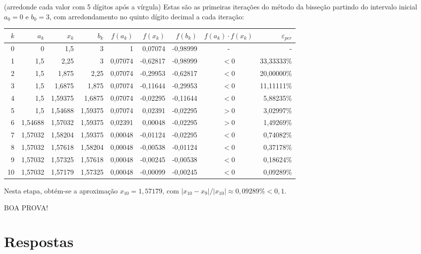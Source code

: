 \documentclass[12pt,a4paper]{article}
\begin{document}
\begin{ExerciseList}
(arredonde cada valor com 5 dígitos após a vírgula)
\Answer Estas são as primeiras iterações do método da bisseção partindo do intervalo inicial $a_0 = 0$ e $b_0 = 3$, com arredondamento no quinto dígito decimal a cada iteração:
\begin{center}
\begin{tabular}{rrrrrrrcr}
\hline
$k$ & $a_k$ & $x_k$ & $b_k$ & $f(a_k)$ & $f(x_k)$ & $f(b_k)$ & $f(a_k)\cdot f(x_k)$ & $\varepsilon_{per}$ \\
\hline
0 & 0 & 1,5 & 3 & 1 & 0,07074 & -0,98999 & - & -\\
1 & 1,5 & 2,25 & 3 & 0,07074 & -0,62817 & -0,98999 & $<0$ & 33,33333\%\\
2 & 1,5 & 1,875 & 2,25 & 0,07074 & -0,29953 & -0,62817 & $<0$ & 20,00000\%\\
3 & 1,5 & 1,6875 & 1,875 & 0,07074 & -0,11644 & -0,29953 & $<0$ & 11,11111\%\\
4 & 1,5 & 1,59375 & 1,6875 & 0,07074 & -0,02295 & -0,11644 & $<0$ & 5,88235\%\\
5 & 1,5 & 1,54688 & 1,59375 & 0,07074 & 0,02391 & -0,02295 & $>0$ & 3,02997\%\\
6 & 1,54688 & 1,57032 & 1,59375 & 0,02391 & 0,00048 & -0,02295 & $>0$ & 1,49269\%\\
7 & 1,57032 & 1,58204 & 1,59375 & 0,00048 & -0,01124 & -0,02295 & $<0$ & 0,74082\%\\
8 & 1,57032 & 1,57618 & 1,58204 & 0,00048 & -0,00538 & -0,01124 & $<0$ & 0,37178\%\\
9 & 1,57032 & 1,57325 & 1,57618 & 0,00048 & -0,00245 & -0,00538 & $<0$ & 0,18624\%\\
10 & 1,57032 & 1,57179 & 1,57325 & 0,00048 & -0,00099 & -0,00245 & $<0$ & 0,09289\%\\\hline
\end{tabular}
\end{center}
\medskip
Nesta etapa, obtém-se a aproximação $x_{10} = 1,57179$, com $|x_{10}-x_9|/|x_{10}| \approx 0,09289\% < 0,1$.

\end{ExerciseList}

\vspace{0.5cm}
\begin{center}
BOA PROVA!
\end{center}

\newpage
\restoregeometry
\section*{Respostas}
\shipoutAnswer
\end{document}
